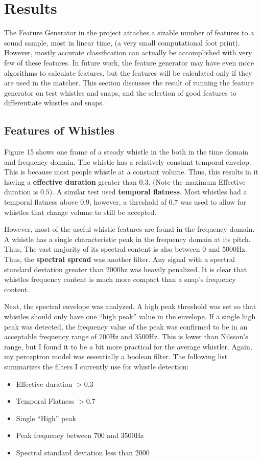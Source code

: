 \documentclass[DIV=calc, paper=a4, fontsize=11pt, twocolumn]{scrartcl}   %
\begin{document}
\section{Results}
   The Feature Generator in the project attaches a sizable number of features to a sound sample, most in linear time,  (a very small computational foot print). However, mostly accurate classification can actually be accomplished with very few of these features. In future work, the feature generator may have even more algorithms to calculate features, but the features will be calculated only if they are used in the matcher. This section discusses the result of running the feature generator on test whistles and snaps, and the selection of good features to differentiate whistles and snaps.

   \subsection{Features of Whistles}

   Figure 15 shows one frame of a steady whistle in the both in the time domain and frequency domain. The whistle has a relatively constant temporal envelop. This is because most people whistle at a constant volume. Thus, this results in it having a \textbf{effective duration} greater than $0.3$. (Note the maximum Effective duration is $0.5$).  A similar test used \textbf{temporal flatness}. Most whistles had a temporal flatness above $0.9$, however, a threshold of $0.7$ was used to allow for whistles that change volume to still be accepted.
   \par However, most of the useful whistle features are found in the frequency domain. A whistle has a single characteristic peak in the frequency domain at its pitch. Thus, The vast majority of its spectral content is also between $0$ and $5000$Hz. Thus, the \textbf{spectral spread} was another filter. Any signal with a spectral standard deviation greater than 2000hz was heavily penalized. It is clear that whistles frequency content is much more compact than a snap's frequency content.

   \par Next, the spectral envelope was analyzed. A high peak threshold was set so that whistles should only have one ``high peak'' value in the envelope. If a single high peak was detected, the frequency value of the peak was confirmed to be in an acceptable frequency range of $700$Hz and $3500$Hz. This is lower than Nilsson's range, but I found it to be a bit more practical for the average whistler. Again, my perceptron model was essentially a boolean filter. The following list summarizes the filters I currently use for whistle detection:
    \begin{itemize}
        \item Effective duration $> 0.3$
        \item Temporal Flatness  $>0.7$
        \item Single ``High'' peak
        \item Peak frequency between $700$ and $3500$Hz
        \item Spectral standard deviation less than $2000$
      \end{itemize}
\end{document}
